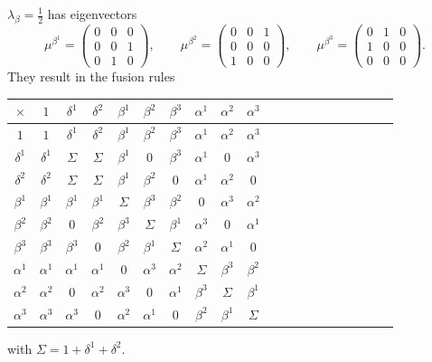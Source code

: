 \documentclass[11pt,oneside]{amsart}
\theoremstyle{plain}%
\theoremstyle{definition}
\theoremstyle{remark}
\begin{document}
$\lambda_{\beta}=\frac{1}{2}$ has eigenvectors
\begin{equation}
	\mu^{\beta^1}=\begin{pmatrix}
		0&0&0\\
		0&0&1\\
		0&1&0
	\end{pmatrix}, \qquad
	\mu^{\beta^2}=\begin{pmatrix}
		0&0&1\\
		0&0&0\\
		1&0&0
	\end{pmatrix}, \qquad
	\mu^{\beta^3}=\begin{pmatrix}
		0&1&0\\
		1&0&0\\
		0&0&0
	\end{pmatrix}.
\end{equation}
They result in the fusion rules
\begin{center}
	\begin{tabular}{|Sc|Sc|Sc|Sc|Sc|Sc|Sc|Sc|Sc|Sc|} \hline
		${\times}$&$1$&$\delta^1$&$\delta^2$&$\beta^1$&$\beta^2$&$\beta^3$&$\alpha^1$&$\alpha^2$&$\alpha^3$\\ \hline
	 	$1$&$1$&$\delta^1$&$\delta^2$&$\beta^1$&$\beta^2$&$\beta^3$&$\alpha^1$&$\alpha^2$&$\alpha^3$\\ \hline
		$\delta^1$&$\delta^1$&$\Sigma$&$\Sigma$&$\beta^1$&$0$&$\beta^3$&$\alpha^1$&$0$&$\alpha^3$\\ \hline
		$\delta^2$&$\delta^2$&$\Sigma$&$\Sigma$&$\beta^1$&$\beta^2$&$0$&$\alpha^1$&$\alpha^2$&$0$\\ \hline
		$\beta^1$&$\beta^1$&$\beta^1$&$\beta^1$&$\Sigma$&$\beta^3$&$\beta^2$&$0$&$\alpha^3$&$\alpha^2$\\ \hline
		$\beta^2$&$\beta^2$&$0$&$\beta^2$&$\beta^3$&$\Sigma$&$\beta^1$&$\alpha^3$&$0$&$\alpha^1$\\ \hline
		$\beta^3$&$\beta^3$&$\beta^3$&$0$&$\beta^2$&$\beta^1$&$\Sigma$&$\alpha^2$&$\alpha^1$&$0$\\ \hline
		$\alpha^1$&$\alpha^1$&$\alpha^1$&$\alpha^1$&$0$&$\alpha^3$&$\alpha^2$&$\Sigma$&$\beta^3$&$\beta^2$\\ \hline
		$\alpha^2$&$\alpha^2$&$0$&$\alpha^2$&$\alpha^3$&$0$&$\alpha^1$&$\beta^3$&$\Sigma$&$\beta^1$\\ \hline
		$\alpha^3$&$\alpha^3$&$\alpha^3$&$0$&$\alpha^2$&$\alpha^1$&$0$&$\beta^2$&$\beta^1$&$\Sigma$\\ \hline
	\end{tabular}
\end{center}
with $\Sigma=1+\delta^1+\delta^2$.
\end{document}
